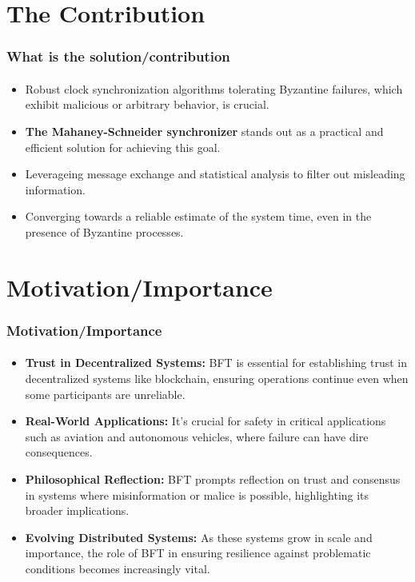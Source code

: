 \documentclass[11pt]{beamer}              %
\begin{document}
\section{The Contribution}
\begin{frame}
\frametitle{What is the solution/contribution}
\framesubtitle{}
\begin{itemize}
  \item Robust clock synchronization algorithms tolerating Byzantine failures, which exhibit malicious or arbitrary behavior, is crucial.
  \item \textbf{The Mahaney-Schneider synchronizer} stands out as a practical and efficient solution for achieving this goal.
  \item Leverageing message exchange and statistical analysis to filter out misleading information.
  \item Converging towards a reliable estimate of the system time, even in the presence of Byzantine processes.
\end{itemize}
\end{frame}


\section{Motivation/Importance}
\begin{frame}
\frametitle{Motivation/Importance}
\framesubtitle{}

\begin{itemize}
  \item \textbf{Trust in Decentralized Systems:} BFT is essential for establishing trust in decentralized systems like blockchain, ensuring operations continue even when some participants are unreliable.
  \item \textbf{Real-World Applications:} It's crucial for safety in critical applications such as aviation and autonomous vehicles, where failure can have dire consequences.
  \item \textbf{Philosophical Reflection:} BFT prompts reflection on trust and consensus in systems where misinformation or malice is possible, highlighting its broader implications.
  \item \textbf{Evolving Distributed Systems:} As these systems grow in scale and importance, the role of BFT in ensuring resilience against problematic conditions becomes increasingly vital.
\end{itemize}
\end{frame}
\end{document}
